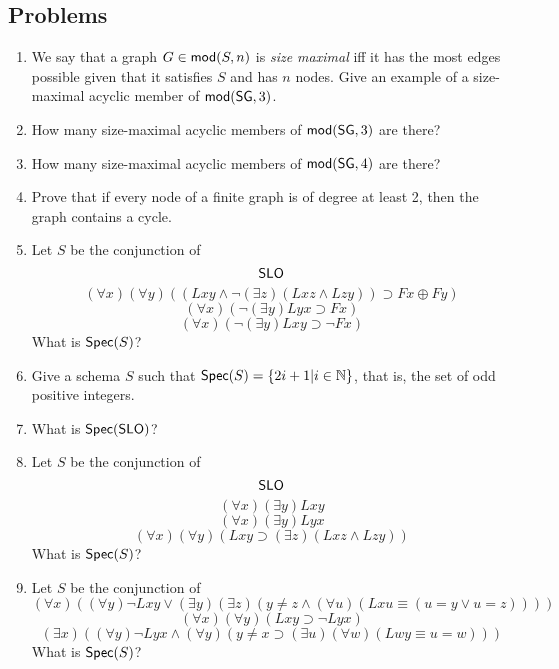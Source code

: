 \newpage
\begin{mdframed}[linewidth=1]
\section*{Problems}
\begin{enumerate}
    \item We say that a graph $G \in \mbox{$\mathsf{mod}(S,n)$}$ is \emph{size maximal} iff it has the most edges possible given that it satisfies $S$ and has $n$ nodes. Give an example of a size-maximal acyclic member of $\mbox{$\mathsf{mod}(\mbox{$\mathsf{SG}$},3)$}$. 

    \item How many size-maximal acyclic members of $\mbox{$\mathsf{mod}(\mbox{$\mathsf{SG}$},3)$}$ are there?

    \item How many size-maximal acyclic members of $\mbox{$\mathsf{mod}(\mbox{$\mathsf{SG}$},4)$}$ are there?

    \item Prove that if every node of a finite graph is of degree at least 2, then the graph contains a cycle. 
\iffalse
\item How many size-maximal members of $\modn{\sg}{6}$ have no 3-cycles? 

    \item Prove the \textbf{Handshake Lemma}: For every graph $G=(V,E)$, $\sum_{v \in V}\deg{v} = 2|E|$. 

    \item Prove that in any graph the number of vertices of odd degree is even.
\fi

    \item Let $S$ be the conjunction of 
   \[
       \mbox{$\mathsf{SLO}$}
   \]
   \[
       (\forall x)(\forall y)((Lxy \land \lnot (\exists z)(Lxz \land Lzy)) \supset Fx \oplus Fy)
   \]
   \[
       (\forall x)(\lnot (\exists y)Lyx\supset Fx)
   \]
   \[
       (\forall x)(\lnot (\exists y)Lxy\supset \lnot Fx)
   \]
   What is $\mbox{$\mathsf{Spec}(S)$}$?

   \item Give a schema $S$ such that $\mbox{$\mathsf{Spec}(S)$} = \{2i + 1 | i \in \mathbb{N}\}$, that is, the set of odd positive integers. 

   \item What is $\mbox{$\mathsf{Spec}(\mbox{$\mathsf{SLO}$})$}$?

   \item Let $S$ be the conjunction of 
   \[
       \mbox{$\mathsf{SLO}$}
   \]
   \[
       (\forall x) (\exists y) Lxy
   \]
   \[
       (\forall x) (\exists y) Lyx
   \]
   \[
       (\forall x)(\forall y)(Lxy \supset (\exists z)(Lxz \land Lzy))
   \]
   What is $\mbox{$\mathsf{Spec}(S)$}$?

   \item Let $S$ be the conjunction of
   \[
       (\forall x)((\forall y) \lnot Lxy \vee (\exists y)(\exists z)(y \neq z \land (\forall u)(Lxu \equiv (u = y \vee u = z))))
   \]
   \[
       (\forall x)(\forall y)(Lxy \supset \lnot Lyx)
   \]
   \[
       (\exists x)((\forall y) \lnot Lyx \land (\forall y)(y \neq x \supset (\exists u)(\forall w)(Lwy \equiv u = w)))
   \]
   What is $\mbox{$\mathsf{Spec}(S)$}$?

\end{enumerate}
\end{mdframed}

